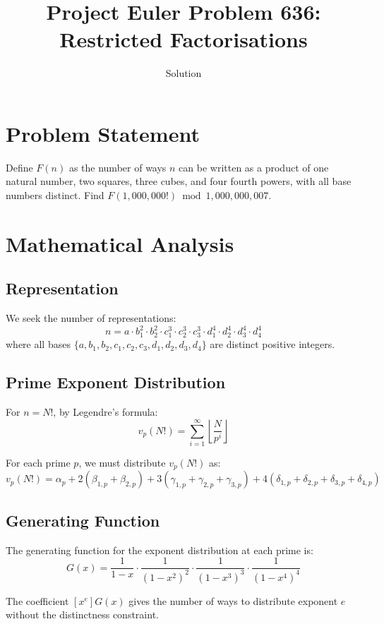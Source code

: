 \documentclass[12pt]{article}
\title{Project Euler Problem 636: Restricted Factorisations}
\author{Solution}
\date{}
\begin{document}
\maketitle

\section{Problem Statement}

Define $F(n)$ as the number of ways $n$ can be written as a product of one natural number, two squares, three cubes, and four fourth powers, with all base numbers distinct. Find $F(1{,}000{,}000!) \bmod 1{,}000{,}000{,}007$.

\section{Mathematical Analysis}

\subsection{Representation}

We seek the number of representations:
\[
n = a \cdot b_1^2 \cdot b_2^2 \cdot c_1^3 \cdot c_2^3 \cdot c_3^3 \cdot d_1^4 \cdot d_2^4 \cdot d_3^4 \cdot d_4^4
\]
where all bases $\{a, b_1, b_2, c_1, c_2, c_3, d_1, d_2, d_3, d_4\}$ are distinct positive integers.

\subsection{Prime Exponent Distribution}

For $n = N!$, by Legendre's formula:
\[
v_p(N!) = \sum_{i=1}^{\infty} \left\lfloor \frac{N}{p^i} \right\rfloor
\]

For each prime $p$, we must distribute $v_p(N!)$ as:
\[
v_p(N!) = \alpha_p + 2(\beta_{1,p} + \beta_{2,p}) + 3(\gamma_{1,p} + \gamma_{2,p} + \gamma_{3,p}) + 4(\delta_{1,p} + \delta_{2,p} + \delta_{3,p} + \delta_{4,p})
\]

\subsection{Generating Function}

The generating function for the exponent distribution at each prime is:
\[
G(x) = \frac{1}{1-x} \cdot \frac{1}{(1-x^2)^2} \cdot \frac{1}{(1-x^3)^3} \cdot \frac{1}{(1-x^4)^4}
\]

The coefficient $[x^e]G(x)$ gives the number of ways to distribute exponent $e$ without the distinctness constraint.
\end{document}
